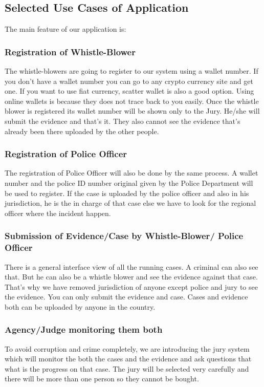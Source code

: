 \subsection{Selected Use Cases of Application}
The main feature of our application is:
\subsubsection{Registration of Whistle-Blower}

The whistle-blowers are going to register to our system using a wallet number. If you don’t have a wallet number you can go to any crypto currency site and get one. If you want to use fiat currency, scatter wallet is also a good option. Using online wallets is because they does not trace back to you easily. Once the whistle blower is registered its wallet number will be shown only to the Jury. He/she will submit the evidence and that’s it. They also cannot see the evidence that’s already been there uploaded by the other people.
   
\subsubsection{Registration of Police Officer}

The registration of Police Officer will also be done by the same process. A wallet number and the police ID number original given by the Police Department will be used to register. If the case is uploaded by the police officer and also in his jurisdiction, he is the in charge of that case else we have to look for the regional officer where the incident happen.  

\subsubsection{Submission of Evidence/Case by Whistle-Blower/ Police Officer}
There is a general interface view of all the running cases. A criminal can also see that. But he can also be a whistle blower and see the evidence against that case. That’s why we have removed jurisdiction of anyone except police and jury to see the evidence. You can only submit the evidence and case. Cases and evidence both can be uploaded by anyone in the country. 

\subsubsection{Agency/Judge monitoring them both}
To avoid corruption and crime completely, we are introducing the jury system which will monitor the both the cases and the evidence and ask questions that what is the progress on that case. The jury will be selected very carefully and there will be more than one person so they cannot be bought. 
